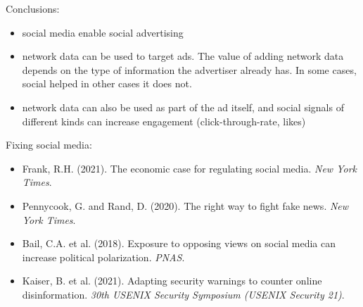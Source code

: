 \documentclass[aspectratio=169]{beamer}
\begin{document}
\begin{frame}

Conclusions:
\begin{itemize}
\item social media enable social advertising \pause
\item network data can be used to target ads. The value of adding network data depends on the type of information the advertiser already has.  In some cases, social helped in other cases it does not.  \pause
\item network data can also be used as part of the ad itself, and social signals of different kinds can increase engagement (click-through-rate, likes)
\end{itemize}

\end{frame}
\begin{frame}

Fixing social media:
\begin{itemize}
\item Frank, R.H. (2021). The economic case for regulating social media. \textit{New York Times}.
\item Pennycook, G. and Rand, D. (2020). The right way to fight fake news. \textit{New York Times}.
\item Bail, C.A. et al. (2018). Exposure to opposing views on social media can increase political polarization. \textit{PNAS}.
\item Kaiser, B. et al. (2021). Adapting security warnings to counter online disinformation. \textit{30th USENIX Security Symposium (USENIX Security 21)}.
\end{itemize}

\end{frame}
\end{document}
